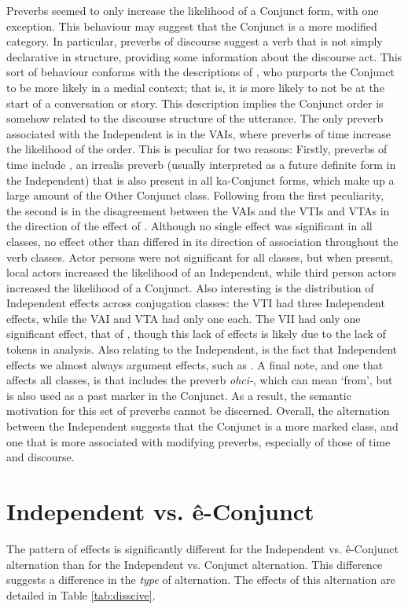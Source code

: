 Preverbs seemed to only increase the likelihood of a Conjunct form, with one exception. This behaviour may suggest that the Conjunct is a more modified category. In particular, preverbs of discourse suggest a verb that is not simply declarative in structure, providing some information about the discourse act. This sort of behaviour conforms with the descriptions of \citet[162]{Cook2008}, who purports the Conjunct to be more likely in a medial context; that is, it is more likely to not be at the start of a conversation or story. This description implies the Conjunct order is somehow related to the discourse structure of the utterance. The only preverb associated with the Independent is in the VAIs, where preverbs of time increase the likelihood of the order. This is peculiar for two reasons: Firstly, preverbs of time include , an irrealis preverb (usually interpreted as a future definite form in the Independent) that is also present in all ka-Conjunct forms, which make up a large amount of the Other Conjunct class. Following from the first peculiarity, the second is in the disagreement between the VAIs and the VTIs and VTAs in the direction of the effect of . Although no single effect was significant in all classes, no effect other than  differed in its direction of association throughout the verb classes. Actor persons were not significant for all classes, but when present, local actors increased the likelihood of an Independent, while third person actors increased the likelihood of a Conjunct. Also interesting is the distribution of Independent effects across conjugation classes: the VTI had three Independent effects, while the VAI and VTA had only one each. The VII had only one significant effect, that of , though this lack of effects is likely due to the lack of tokens in analysis.  Also relating to the Independent, is the fact that Independent effects we almost always argument effects, such as . A final note, and one that affects all classes, is that  includes the preverb \textit{ohci-}, which can mean `from', but is also used as a past marker in the Conjunct. As a result, the semantic motivation for this set of preverbs cannot be discerned. Overall, the alternation between the Independent suggests that the Conjunct is a more marked class, and one that is more associated with modifying preverbs, especially of those of time and discourse. 




\section{Independent vs. ê-Conjunct}
The pattern of effects is significantly different for the Independent vs. ê-Conjunct alternation than for the Independent vs. Conjunct alternation. This difference suggests a difference in the \textit{type} of alternation. The effects of this alternation are detailed in Table \ref{tab:disscive}. 

